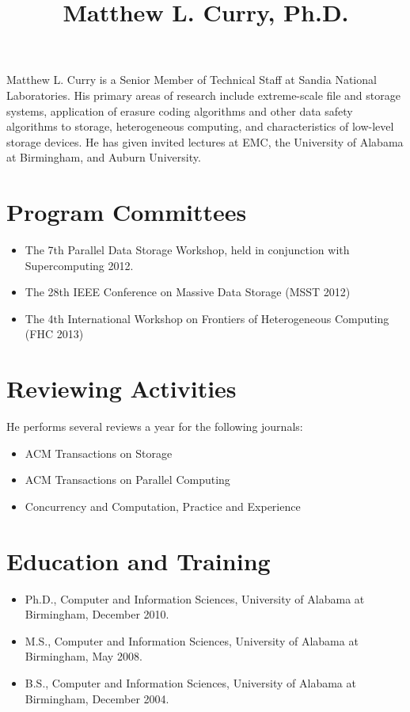 \documentclass[11pt]{article}
\begin{document}
\title{Matthew L. Curry, Ph.D.}
\author{}
\date{}
\maketitle
\vspace{-0.75in}
Matthew L. Curry is a Senior Member of Technical Staff at Sandia
National Laboratories. His primary areas of research include
extreme-scale file and storage systems, application of erasure coding
algorithms and other data safety algorithms to storage, heterogeneous
computing, and characteristics of low-level storage devices. He has
given invited lectures at EMC, the University of Alabama at
Birmingham, and Auburn University.

\vspace{-0.75em}
\section*{Program Committees}
\vspace{-0.75em}
\begin{itemize}
\item The 7th Parallel Data Storage Workshop, held in conjunction with
  Supercomputing 2012.
\item The 28th IEEE Conference on Massive Data Storage (MSST 2012)
\item The 4th International Workshop on Frontiers of Heterogeneous
  Computing (FHC 2013)
\end{itemize}

\vspace{-0.75em}
\section*{Reviewing Activities}
\vspace{-0.75em}
He performs several reviews a year for the following journals:
\begin{itemize}
\item ACM Transactions on Storage
\item ACM Transactions on Parallel Computing
\item Concurrency and Computation, Practice and Experience
\end{itemize}

\vspace{-0.75em}
\section*{Education and Training}
\vspace{-0.75em}
\begin{itemize}
\item Ph.D., Computer and Information Sciences, University of Alabama at Birmingham, December 2010.
\item M.S., Computer and Information Sciences, University of Alabama at Birmingham, May 2008.
\item B.S., Computer and Information Sciences, University of Alabama at Birmingham, December 2004.
\end{itemize}
\end{document}
